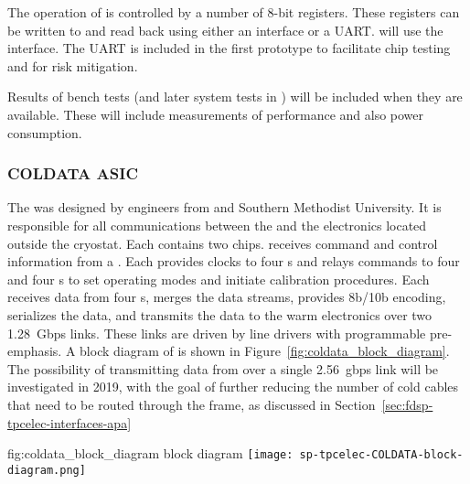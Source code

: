 The operation of  is controlled by a number of 8-bit registers.
These registers can be written to and read back using either an 
interface or a UART.   will use the  interface.  The
UART is included in the first  prototype to facilitate chip testing
and for risk mitigation.

Results of bench tests (and later system tests in ) will be included
when they are available.  These will include measurements of performance and
also power consumption.

\subsubsection{COLDATA ASIC}
\label{sec:fdsp-tpcelec-design-femb-coldata}

The   was designed by engineers from  
and Southern Methodist University. It is responsible for all communications 
between the  and the electronics located outside the cryostat. 
Each  contains two  chips.  receives 
command and control information from a . Each  provides 
clocks to four s and relays commands to four  
  and four s to set operating modes and 
initiate calibration procedures.  Each  receives data from four 
s, merges the data streams, provides 8b/10b encoding, serializes 
the data, and transmits the data to the warm electronics over two \SI{1.28}{Gbps} 
links.  These links are driven by line drivers with programmable pre-emphasis. 
A block diagram of  is shown in Figure~\ref{fig:coldata_block_diagram}.
The possibility of transmitting data from  over a single 
\SI{2.56}{gbps} link will be investigated in 2019, with the goal of further
reducing the number of cold cables that need to be routed through the
 frame, as discussed in Section~\ref{sec:fdsp-tpcelec-interfaces-apa}

\begin{dunefigure}
{fig:coldata_block_diagram}
{ block diagram}
\texttt{[image: sp-tpcelec-COLDATA-block-diagram.png]}
\end{dunefigure}

